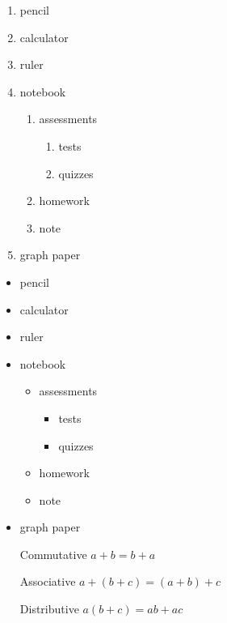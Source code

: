 \documentclass[11pt]{article}
\begin{document}
\begin{enumerate}
\item pencil
\item calculator
\item ruler
\item notebook
	\begin{enumerate}
	\item assessments
		\begin{enumerate}
		\item tests
		\item quizzes
		\end{enumerate}
	\item homework
	\item note
	\end{enumerate}
\item graph paper 
\end{enumerate}

\begin{itemize}
\item pencil
\item calculator
\item ruler
\item notebook
	\begin{itemize}
	\item assessments
		\begin{itemize}
		\item tests
		\item quizzes
		\end{itemize}
	\item homework
	\item note
	\end{itemize}
\item graph paper 
\end{itemize}

\begin{enumerate}
\item[Commutative] $a+b=b+a$
\item[Associative] $a+(b+c)=(a+b)+c$
\item[Distributive] $a(b+c)=ab+ac$
\end{enumerate}



 
\end{document}
